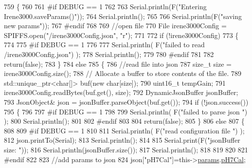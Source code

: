 \begin{DoxyCode}
759 \{
760 
761 \textcolor{preprocessor}{#if DEBUG == 1}
762         
763     Serial.println(F(\textcolor{stringliteral}{"Entering Irene3000.saveParams()"}));
764     Serial.println();
765     
766     Serial.println(F(\textcolor{stringliteral}{"saving new params"}));
767 \textcolor{preprocessor}{#endif}
768     
769     \textcolor{comment}{//open file}
770     File irene3000Config = SPIFFS.open(\textcolor{stringliteral}{"/irene3000Config.json"}, \textcolor{stringliteral}{"r"});
771 
772     \textcolor{keywordflow}{if} (!irene3000Config) 
773     \{
774     
775 \textcolor{preprocessor}{    #if DEBUG == 1 }
776 
777         Serial.println( F(\textcolor{stringliteral}{"failed to read /irene3000Config.json"}) );
778         Serial.println();
779     
780 \textcolor{preprocessor}{    #endif}
781 
782         \textcolor{keywordflow}{return}(\textcolor{keyword}{false});
783     \}
784     \textcolor{keywordflow}{else}
785     \{
786         \textcolor{comment}{//read file into json}
787         \textcolor{keywordtype}{size\_t} size = irene3000Config.size();
788         \textcolor{comment}{// Allocate a buffer to store contents of the file.}
789         std::unique\_ptr<char[]> buf(\textcolor{keyword}{new} \textcolor{keywordtype}{char}[size]);
790             uint16\_t tempGain;
791         irene3000Config.readBytes(buf.get(), size);
792         DynamicJsonBuffer jsonBuffer;
793         JsonObject& json = jsonBuffer.parseObject(buf.get());
794         \textcolor{keywordflow}{if} (!json.success()) 
795         \{
796         
797 \textcolor{preprocessor}{        #if DEBUG == 1 }
798 
799             Serial.println( F(\textcolor{stringliteral}{"failed to parse json "}) );
800             Serial.println();
801         
802 \textcolor{preprocessor}{        #endif}
803             
804             \textcolor{keywordflow}{return}(\textcolor{keyword}{false});
805         \} 
806         \textcolor{keywordflow}{else}
807         \{
808         
809 \textcolor{preprocessor}{        #if DEBUG == 1 }
810     
811             Serial.println( F(\textcolor{stringliteral}{"read configuration file "}) );
812             json.printTo(Serial);
813             Serial.println();
814 
815             Serial.print(F(\textcolor{stringliteral}{"jsonBuffer size: "}));
816             Serial.println(jsonBuffer.size());
817             Serial.println();
818 
819         
820 
821 \textcolor{preprocessor}{        #endif          }
822     
823             \textcolor{comment}{//add params to json}
824             json[\textcolor{stringliteral}{"pH7Cal"}]=this->\hyperlink{class_irene3000_a136585a5ee7f9ac6ab52175fa153f8e3}{params}.\hyperlink{struct_irene3000_1_1parameters___t_a21265466a570d84bff914f26d2f7a03e}{pH7Cal};

\end{DoxyCode}
